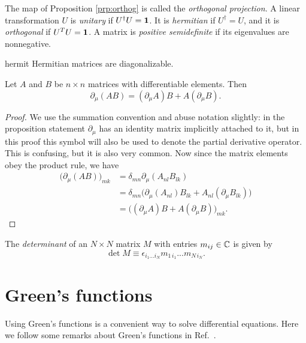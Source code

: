   The map of Proposition \ref{prp:orthog} is called the {\it orthogonal
  projection}.
  A linear transformation $U$ is {\it unitary} if $U^\dagger U={\mathbf 1}$.
  It is {\it hermitian} if $U^\dagger=U$, and it is {\it orthogonal}
  if $U^TU={\mathbf 1}$. A matrix is
  {\it positive semidefinite} if its eigenvalues are nonnegative.

\begin{theorem}{}{hermit}
  Hermitian matrices are diagonalizable.
\end{theorem}

\begin{proposition}{}{}
  Let $A$ and $B$ be $n\times n$ matrices with differentiable elements. Then
  $$
    \partial_\mu(AB)=(\partial_\mu A)B+A(\partial_\mu B).
  $$
  \begin{proof}
    We use the summation convention and abuse notation slightly: in the
    proposition statement $\partial_\mu$ has an identity matrix implicitly
    attached to it, but in this proof this symbol will also be used to
    denote the partial derivative operator. This is confusing, but
    it is also very common. Now since the matrix elements obey the product
    rule, we have
    \begin{equation*}
      \begin{aligned}
        \big(\partial_\mu(AB)\big)_{mk}
          &=\delta_{mn}\partial_\mu(A_{nl}B_{lk})\\
          &=\delta_{mn}\big(\partial_\mu(A_{nl})B_{lk}
                            +A_{nl}(\partial_\mu B_{lk})\big)\\
          &=\big((\partial_\mu A)B+A(\partial_\mu B)\big)_{mk}.
      \end{aligned}
    \end{equation*}
  \end{proof}
\end{proposition}

The {\it determinant} of an $N\times N$ matrix $M$
with entries $m_{ij}\in\mathbb{C}$ is given by
\begin{equation}
  \det M\equiv\epsilon_{i_1...i_N}m_{1\,i_1}...m_{N\,i_N}.
\end{equation}

\section{Green's functions}
Using Green's functions is a convenient way to solve differential equations.
Here we follow some remarks about Green's functions in
Ref.~\cite{mccomb_renormalization_2004}.

